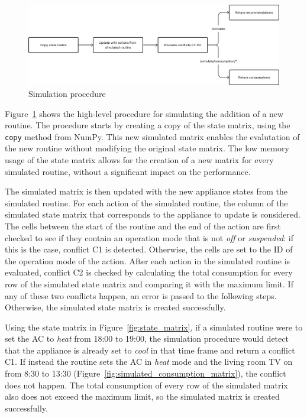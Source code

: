 \begin{figure}
    \centering
    \includegraphics[width=\textwidth]{images/simulation_procedure.png}
    \caption{Simulation procedure}%
    \label{fig:simulation_procedure}
\end{figure}

Figure~\ref{fig:simulation_procedure} shows the high-level procedure for simulating the addition of a new routine. The procedure starts by creating a copy of the state matrix, using the \texttt{copy} method from NumPy. This new simulated matrix enables the evalutation of the new routine without modifying the original state matrix. The low memory usage of the state matrix allows for the creation of a new matrix for every simulated routine, without a significant impact on the performance.

The simulated matrix is then updated with the new appliance states from the simulated routine. For each action of the simulated routine, the column of the simulated state matrix that corresponds to the appliance to update is considered. The cells between the start of the routine and the end of the action are first checked to see if they contain an operation mode that is not \textit{off} or \textit{suspended}: if this is the case, conflict C1 is detected. Otherwise, the cells are set to the ID of the operation mode of the action. After each action in the simulated routine is evaluated, conflict C2 is checked by calculating the total consumption for every row of the simulated state matrix and comparing it with the maximum limit. If any of these two conflicts happen, an error is passed to the following steps. Otherwise, the simulated state matrix is created successfully.

Using the state matrix in Figure~\ref{fig:state_matrix}, if a simulated routine were to set the AC to \textit{heat} from 18:00 to 19:00, the simulation procedure would detect that the appliance is already set to \textit{cool} in that time frame and return a conflict C1. If instead the routine sets the AC in \textit{heat} mode and the living room TV on from 8:30 to 13:30 (Figure~\ref{fig:simulated_consumption_matrix}), the conflict does not happen. The total consumption of every row of the simulated matrix also does not exceed the maximum limit, so the simulated matrix is created successfully.

